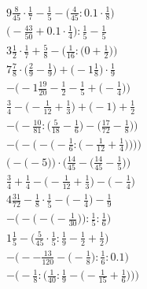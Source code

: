 \documentclass[8pt]{article}
\begin{document}
\begin{align}
9\frac{8}{45} \cdot \frac{1}{7} - \frac{1}{5} - \big(\frac{4}{45} : 0.1 \cdot \frac{1}{8}\big) \\
\big(-\frac{43}{50} + 0.1 \cdot \frac{1}{4}\big) : \frac{1}{5} - \frac{1}{5} \\
3\frac{1}{2} \cdot \frac{1}{7} + \frac{5}{8} - \Big(\frac{1}{16} : \big(0 + \frac{1}{2}\big)\Big) \\
7\frac{7}{8} \cdot \big(\frac{2}{9} - \frac{1}{9}\big) + \big(-1\frac{1}{8}\big) \cdot \frac{1}{9} \\
-\Big(-1\frac{19}{20} - \frac{1}{2} - \frac{1}{5} + \big(-\frac{1}{4}\big)\Big) \\
\frac{3}{4} - \big(-\frac{1}{12} + \frac{1}{3}\big) + \big(-1\big) + \frac{1}{2} \\
-\Big(-\frac{10}{81} : \big(\frac{5}{18} - \frac{1}{6}\big) - \big(\frac{17}{72} - \frac{1}{8}\big)\Big) \\
-\Bigg(-\bigg(-\Big(-\frac{1}{6} : \big(-\frac{1}{12} + \frac{1}{4}\big)\Big)\bigg)\Bigg) \\
\Big(-\big(-5\big)\Big) \cdot \Big(\frac{14}{45} - \big(\frac{14}{45} - \frac{1}{5}\big)\Big) \\
\frac{3}{4} + \frac{1}{4} - \big(-\frac{1}{12} + \frac{1}{3}\big) - \big(-\frac{1}{4}\big) \\
4\frac{31}{72} - \frac{1}{8} \cdot \frac{1}{5} - \big(-\frac{1}{4}\big) - \frac{1}{9} \\
-\bigg(-\Big(-\big(-\frac{1}{30}\big)\Big) : \frac{1}{5} : \frac{1}{6}\bigg) \\
1\frac{1}{5} - \big(\frac{5}{45} \cdot \frac{1}{5} : \frac{1}{9} - \frac{1}{2} + \frac{1}{2}\big) \\
-\Big(--\frac{13}{120} - \big(-\frac{1}{8}\big) : \frac{1}{6} : 0.1\Big) \\
-\bigg(-\frac{1}{8} : \Big(\frac{1}{40} : \frac{1}{9} - \big(-\frac{1}{15} + \frac{1}{6}\big)\Big)\bigg)
\end{align}
\end{document}
